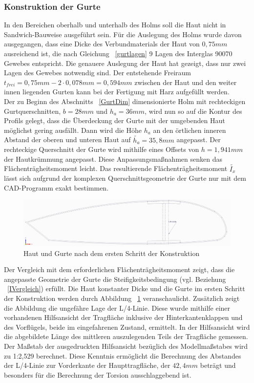 \subsubsection{Konstruktion der Gurte}
\label{GurtKonstrukt}
\noindent In den Bereichen oberhalb und unterhalb des Holms soll die Haut nicht in Sandwich-Bauweise ausgeführt sein. Für die Auslegung des Holms wurde davon ausgegangen, dass eine Dicke des Verbundmaterials der Haut von $ 0,75mm $ ausreichend ist, die nach Gleichung ~\ref{gurtlagen} 9 Lagen des Interglas 90070 Gewebes entspricht. Die genauere Auslegung der Haut hat gezeigt, dass nur zwei Lagen des Gewebes notwendig sind. Der entstehende Freiraum $t_{frei}= 0,75mm-2\cdot 0,078mm=0,594mm $ zwischen der Haut und den weiter innen liegenden Gurten kann bei der Fertigung mit Harz aufgefüllt werden.\\
\noindent Der zu Beginn des Abschnitts ~\ref{GurtDim} dimensionierte Holm mit rechteckigen Gurtquerschnitten, $ b=28mm $ und $ h_{a}=36mm $, wird nun so auf die Kontur des Profils gelegt, dass die Überdeckung der Gurte mit der umgebenden Haut möglichst gering ausfällt. Dann wird die Höhe $ h_{a} $ an den örtlichen inneren Abstand der oberen und unteren Haut auf $\tilde{h_{a}}=35,8mm $ angepasst. Der rechteckige Querschnitt der Gurte wird mithilfe eines Offsets von $ {h}=1,941mm $ der Hautkrümmung angepasst. Diese Anpassungsmaßnahmen senken das Flächenträgheitsmoment leicht. Das resultierende Flächenträgheitsmoment $ \tilde{I_{x}} $ lässt sich aufgrund der komplexen Querschnittsgeometrie der Gurte nur mit dem CAD-Programm exakt bestimmen. 
\begin{figure}[h]
	\includegraphics[width=1.0\textwidth]{Bilder/Kontur.jpg}
	\caption{Haut und Gurte nach dem ersten Schritt der Konstruktion}
	\label{fig: Kontur}
\end{figure} 
Der Vergleich mit dem erforderlichen Flächenträgheitsmoment zeigt, dass die angepasste Geometrie der Gurte die Steifigkeitsbedingung (vgl. Beziehung ~\ref{IVergleich}) erfüllt. Die Haut konstanter Dicke und die Gurte im ersten Schritt der Konstruktion werden durch Abbildung ~\ref{fig: Kontur} veranschaulicht. Zusätzlich zeigt die Abbildung die ungefähre Lage der L/4-Linie. Diese wurde mithilfe einer vorhandenen Hilfsansicht der Tragfläche inklusive der Hinterkantenklappen und des Vorflügels, beide im eingefahrenen Zustand, ermittelt. In der Hilfsansicht wird die abgebildete Länge des mittleren auszulegenden Teils der Tragfläche gemessen. Der Maßstab der ausgedruckten Hilfsansicht bezüglich des Modellmaßstabes wird zu 1:2,529 berechnet. Diese Kenntnis ermöglicht die Berechnung des Abstandes der L/4-Linie zur Vorderkante der Haupttragfläche, der $ 42,4mm $ beträgt und besonders für die Berechnung der Torsion ausschlaggebend ist.\\

